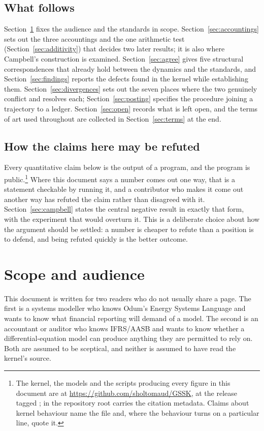 \documentclass[11pt,a4paper]{article}
\begin{document}
\subsection*{What follows}

Section~\ref{sec:scope} fixes the audience and the standards in scope. Section~\ref{sec:accountings} sets out the three accountings and the one arithmetic test (Section~\ref{sec:additivity}) that decides two later results; it is also where Campbell's construction is examined. Section~\ref{sec:agree} gives five structural correspondences that already hold between the dynamics and the standards, and Section~\ref{sec:findings} reports the defects found in the kernel while establishing them. Section~\ref{sec:divergences} sets out the seven places where the two genuinely conflict and resolves each; Section~\ref{sec:posting} specifies the procedure joining a trajectory to a ledger. Section~\ref{sec:open} records what is left open, and the terms of art used throughout are collected in Section~\ref{sec:terms} at the end.

\subsection*{How the claims here may be refuted}

Every quantitative claim below is the output of a program, and the program is public.\footnote{The kernel, the models and the scripts producing every figure in this document are at \url{https://github.com/sholtomaud/GSSK}, at the release tagged ;  in the repository root carries the citation metadata. Claims about kernel behaviour name the file and, where the behaviour turns on a particular line, quote it.} Where this document says a number comes out one way, that is a statement checkable by running it, and a contributor who makes it come out another way has refuted the claim rather than disagreed with it. Section~\ref{sec:campbell} states the central negative result in exactly that form, with the experiment that would overturn it. This is a deliberate choice about how the argument should be settled: a number is cheaper to refute than a position is to defend, and being refuted quickly is the better outcome.

\section{Scope and audience}
\label{sec:scope}

This document is written for two readers who do not usually share a page. The first is a systems modeller who knows Odum's Energy Systems Language and wants to know what financial reporting will demand of a model. The second is an accountant or auditor who knows IFRS/AASB and wants to know whether a differential-equation model can produce anything they are permitted to rely on. Both are assumed to be sceptical, and neither is assumed to have read the kernel's source.
\end{document}
